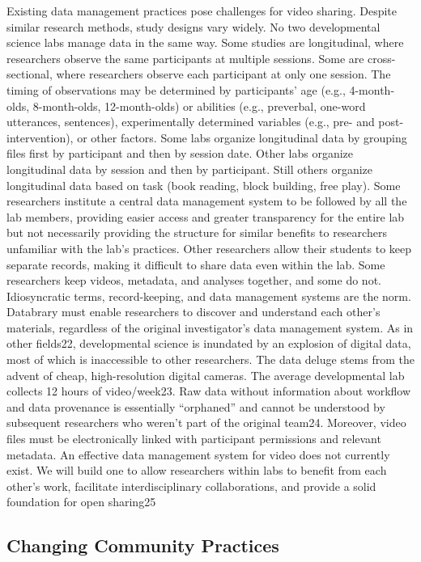 \documentclass[letterpaper,man,natbib]{apa6}
\begin{document}
Existing data management practices pose challenges for video sharing.
Despite similar research methods, study designs vary widely. 
No two developmental science labs manage data in the same way. 
Some studies are longitudinal, where researchers observe the same participants at
multiple sessions. 
Some are cross-sectional, where researchers observe
each participant at only one session. 
The timing of observations may be
determined by participants’ age (e.g., 4-month-olds, 8-month-olds,
12-month-olds) or abilities (e.g., preverbal, one-word utterances,
sentences), experimentally determined variables (e.g., pre- and
post-intervention), or other factors. 
Some labs organize longitudinal data by grouping files first by participant and then by session date.
Other labs organize longitudinal data by session and then by
participant. 
Still others organize longitudinal data based on task (book reading, block building, free play). Some researchers institute a central data management system to be followed by all the lab members, providing easier access and greater transparency for the entire lab but not necessarily providing the structure for similar benefits to
researchers unfamiliar with the lab’s practices. 
Other researchers allow their students to keep separate records, making it difficult to share
data even within the lab. 
Some researchers keep videos, metadata, and analyses together, and some do not. Idiosyncratic terms, record-keeping, and data management systems are the norm. 
Databrary must enable researchers to discover and understand each other’s materials, regardless of the original investigator’s data management system.
As in other fields22, developmental science is inundated by an explosion of digital data, most of which is inaccessible to other researchers. The data deluge stems from the advent of cheap, high-resolution digital cameras. The average developmental lab collects 12 hours of video/week23. Raw data without information about workflow and data provenance is essentially “orphaned” and cannot be understood by subsequent researchers who weren’t part of the original team24. Moreover, video files must be electronically linked with participant permissions and relevant metadata. An effective data management system for video does not currently exist. We will build one to allow researchers within labs to benefit from each other’s work, facilitate interdisciplinary collaborations, and provide a solid foundation for open sharing25

\subsection{Changing Community Practices}
\end{document}

